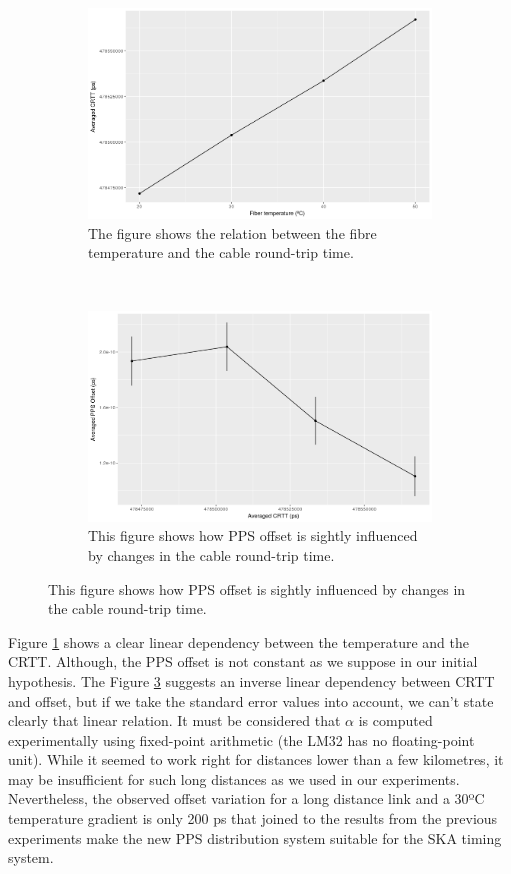\begin{figure}
	\centering
	\begin{subfigure}[t]{0.48\textwidth}
		\includegraphics[width=\textwidth]{img/crttvstemp}
		\caption[CRTT vs. Fiber temperature]{The figure shows the relation 
			between the fibre temperature and the cable round-trip time.}
		\label{fig:crttvstemp}
	\end{subfigure}
	~ %
	\begin{subfigure}[t]{0.48\textwidth}
		\includegraphics[width=\textwidth]{img/ppsvscrtt}
		\caption[PPS offset vs. CRTT]{This figure shows how PPS offset is 
			sightly influenced by changes in the cable round-trip time.}
		\label{fig:ppsvscrtt}
	\end{subfigure}
\end{figure}

Figure \ref{fig:crttvstemp} shows a clear linear dependency between the 
temperature and the CRTT. Although, the PPS offset is not constant as 
we suppose in our initial hypothesis. The Figure \ref{fig:ppsvscrtt} suggests 
an inverse linear dependency between CRTT and offset, but if we take the 
standard error values into account, we can't state clearly that linear 
relation. It must be considered that $\alpha$ is computed experimentally using 
fixed-point arithmetic (the LM32 has no floating-point unit). While it seemed 
to work right for distances lower than a few kilometres, it may be insufficient 
for such long distances as we used in our experiments. Nevertheless, the 
observed offset variation for a long distance link and a 30ºC temperature 
gradient is only 200 ps that joined to the results from the previous 
experiments make the new PPS distribution system suitable for the SKA 
timing system.
